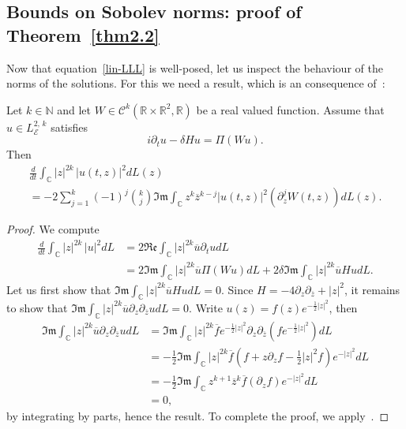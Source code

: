 \documentclass[AHL,Unicode,published]{cedram}
\newcommand{\C}{\mathbb{C}}
\newcommand{\R}{\mathbb{R}}
\newcommand{\N}{\mathbb{N}}
\newcommand{\E}{\mathcal{E}}
\newcommand{\clC}{\mathcal{C}}
\newcommand{\fkIm}{\mathfrak{Im}}
\newcommand{\fkRe}{\mathfrak{Re}}
\newcommand{\ov}{\overline}
\newcommand{\<}{\langle}
\renewcommand{\>}{\rangle}
\newcommand{\R}{\mathbb{R}}
\begin{document}
\subsection{Bounds on Sobolev norms: proof of Theorem~\ref{thm2.2}}

Now that equation~\eqref{lin-LLL} is well-posed, let us inspect the behaviour of the norms of the solutions. For this we need a result, which is an consequence of~\cite[Lemma~2.1]{Schw-Tho}:



\begin{lemm}
Let $k \in \N$ and let $W \in \clC^k(\R \times \R^2, \R)$ be a real valued function. Assume that $u\in L^{2,\,k}_\E$ satisfies
\[
i \partial_t u- \delta Hu=\Pi \left(W u\right).
\]
Then
\begin{multline}\label{form-deri0}
\frac{d}{dt}\int_{\C}|z|^{2k}\,|u(t,z)|^2dL(z)\\
= -2\sum_{j=1}^k(-1)^j\binom{{k}}{{j}}\fkIm \int_{\C} z^k \ov{z}^{k-j} |u(t,z)|^2 \left(\partial_z^j W(t,z)\right)dL(z).
\end{multline}
\end{lemm}

\begin{proof}
We compute
\begin{align*}
\frac{d}{dt}\int_{\C}|z|^{2k}\,|u|^2dL&= 2\fkRe \int_{\C} |z|^{2k} \ov{u}\partial_t u dL\\
&= 2\fkIm \int_{\C} |z|^{2k} \ov{u}\Pi(Wu) dL+2\delta \fkIm \int_{\C} |z|^{2k} \ov{u}Hu dL.
\end{align*}
Let us first show that $\fkIm \int_{\C} |z|^{2k} \ov{u}Hu dL=0$. Since $H = -4\partial_z \partial_{\ov z}+|z|^2$, it remains to show that $ \fkIm \int_{\C} |z|^{2k} \ov{u} \partial_z \partial_{\ov z}u dL=0$. Write $u(z)=f(z)e^{-\frac12|z|^2}$, then
\begin{align*}
\fkIm \int_{\C} |z|^{2k} \ov{u} \partial_z \partial_{\ov z}u dL&= \fkIm \int_{\C} |z|^{2k} \ov{f}e^{-\frac12|z|^2} \partial_z
\partial_{\ov z}\left(fe^{-\frac12|z|^2}\right)dL\\
&= -\frac12 \fkIm \int_{\C} |z|^{2k} \ov{f} \left(f+z\partial_zf-\frac12 |z|^2f\right)e^{-|z|^2}dL\\
&= -\frac12 \fkIm \int_{\C} z^{k+1}\ov{z}^k \ov{f} \left(\partial_zf\right) e^{-|z|^2}dL\\
&=0,
\end{align*}
by integrating by parts, hence the result. To complete the proof, we apply~\cite[Lemma~2.1]{Schw-Tho}.
\end{proof}
\end{document}
